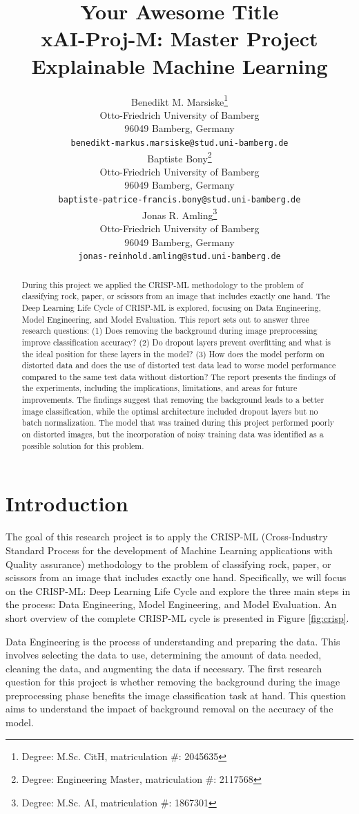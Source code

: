 \documentclass[a4paper]{article}
\title{ Your Awesome Title\\ {\large xAI-Proj-M: Master Project Explainable Machine Learning }}
\author{%
  Benedikt M. Marsiske\thanks{Degree: M.Sc. CitH, matriculation \#: 2045635} \\
  Otto-Friedrich University of Bamberg\\
  96049 Bamberg, Germany\\
  \texttt{benedikt-markus.marsiske@stud.uni-bamberg.de}\\
   \And
   Baptiste Bony\thanks{Degree: Engineering Master, matriculation \#: 2117568}\\
   Otto-Friedrich University of Bamberg\\
   96049 Bamberg, Germany\\
   \texttt{baptiste-patrice-francis.bony@stud.uni-bamberg.de} \\
   \And
   Jonas R. Amling\thanks{Degree: M.Sc. AI, matriculation \#: 1867301}\\
   Otto-Friedrich University of Bamberg\\
   96049 Bamberg, Germany\\
   \texttt{jonas-reinhold.amling@stud.uni-bamberg.de} \\
}
\begin{document}
\maketitle
\def\va{{\bm{a}}}

\begin{abstract}
 During this project we applied the CRISP-ML methodology to the problem of classifying rock, paper, or scissors from an image that includes exactly one hand. The Deep Learning Life Cycle of CRISP-ML is explored, focusing on Data Engineering, Model Engineering, and Model Evaluation. This report sets out to answer three research questions: (1) Does removing the background during image preprocessing improve classification accuracy? (2) Do dropout layers prevent overfitting and what is the ideal position for these layers in the model? (3) How does the model perform on distorted data and does the use of distorted test data lead to worse model performance compared to the same test data without distortion? The report presents the findings of the experiments, including the implications, limitations, and areas for future improvements. The findings suggest that removing the background leads to a better image classification, while the optimal architecture included dropout layers but no batch normalization. The model that was trained during this project performed poorly on distorted images, but the incorporation of noisy training data was identified as a possible solution for this problem.
\end{abstract}


\section{Introduction}

The goal of this research project is to apply the CRISP-ML (Cross-Industry Standard Process for the development of Machine Learning applications with Quality assurance) methodology \citep{crisp} to the problem of classifying rock, paper, or scissors from an image that includes exactly one hand. Specifically, we will focus on the CRISP-ML: Deep Learning Life Cycle and explore the three main steps in the process: Data Engineering, Model Engineering, and Model Evaluation. An short overview of the complete CRISP-ML cycle is presented in Figure \ref{fig:crisp}.

Data Engineering is the process of understanding and preparing the data. This involves selecting the data to use, determining the amount of data needed, cleaning the data, and augmenting the data if necessary. The first research question for this project is whether removing the background during the image preprocessing phase benefits the image classification task at hand. This question aims to understand the impact of background removal on the accuracy of the model.
\end{document}
